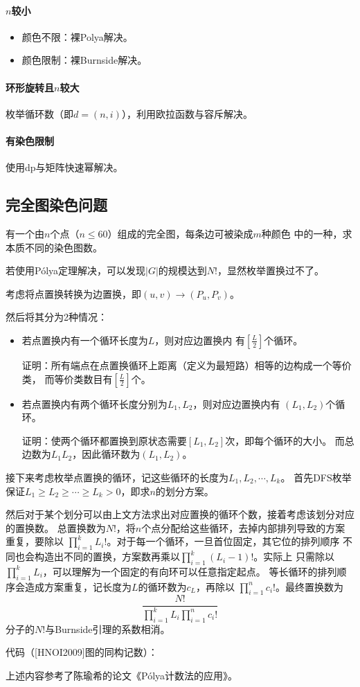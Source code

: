 \paragraph{$n$较小}
\begin{itemize}
	\item 颜色不限：裸Polya解决。
	\item 颜色限制：裸Burnside解决。
\end{itemize}
\paragraph{环形旋转且$n$较大}
枚举循环数（即$d=(n,i)$），利用欧拉函数与容斥解决。
\paragraph{有染色限制}
使用dp与矩阵快速幂解决。

\subsection{完全图染色问题}
有一个由$n$个点（$n\leq 60$）组成的完全图，每条边可被染成$m$种颜色
中的一种，求本质不同的染色图数。

若使用Pólya定理解决，可以发现$|G|$的规模达到$N!$，显然枚举置换过不了。

考虑将点置换转换为边置换，即$(u,v)\rightarrow (P_u,P_v)$。

然后将其分为2种情况：
\begin{itemize}
	\item 若点置换内有一个循环长度为$L$，则对应边置换内
	有$\left[\frac{L}{2}\right]$个循环。

	证明：所有端点在点置换循环上距离（定义为最短路）相等的边构成一个等价类，
	而等价类数目有$\left[\frac{L}{2}\right]$个。

	\item 若点置换内有两个循环长度分别为$L_1,L_2$，则对应边置换内有
	$(L_1,L_2)$个循环。

	证明：使两个循环都置换到原状态需要$[L_1,L_2]$次，即每个循环的大小。
	而总边数为$L_1L_2$，因此循环数为$(L_1,L_2)$。
\end{itemize}

接下来考虑枚举点置换的循环，记这些循环的长度为$L_1,L_2,\cdots,L_k$。
首先DFS枚举保证$L_1\geq L_2 \geq \cdots \geq L_k>0$，即求$n$的划分方案。

然后对于某个划分可以由上文方法求出对应置换的循环个数，接着考虑该划分对应的置换数。
总置换数为$N!$，将$n$个点分配给这些循环，去掉内部排列导致的方案重复，要除以
$\displaystyle \prod_{i=1}^k{L_i!}$。对于每一个循环，一旦首位固定，其它位的排列顺序
不同也会构造出不同的置换，方案数再乘以$\displaystyle \prod_{i=1}^k{(L_i-1)!}$。实际上
只需除以$\displaystyle \prod_{i=1}^k{L_i}$，可以理解为一个固定的有向环可以任意指定起点。
等长循环的排列顺序会造成方案重复，记长度为$L$的循环数为$c_L$，再除以
$\displaystyle \prod_{i=1}^n{c_i!}$。最终置换数为
\begin{displaymath}
	\frac{N!}{\prod_{i=1}^k{L_i}\prod_{i=1}^n{c_i!}}
\end{displaymath}
分子的$N!$与Burnside引理的系数相消。

代码（[HNOI2009]图的同构记数）：


上述内容参考了陈瑜希的论文《Pólya计数法的应用》。

